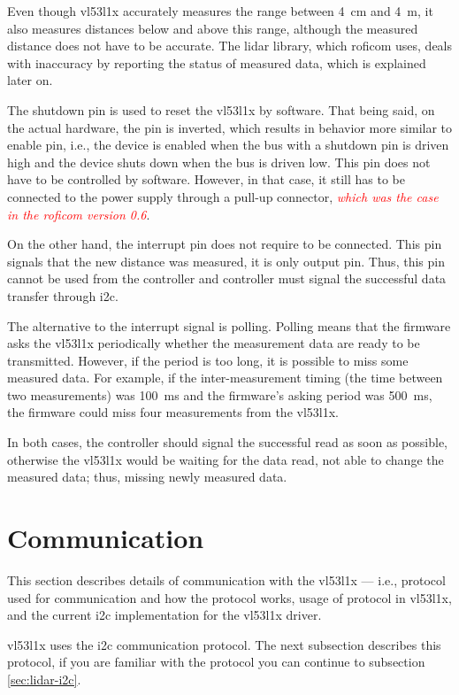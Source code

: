 \documentclass[
  digital,     %
  oneside,     %
  nosansbold,  %
  nocolorbold, %
  lof,         %
  lot,         %
]{fithesis4}
\newcommand{\TODO}[1]{\textcolor{red}{\textit{#1}}}
\begin{document}
{{{Even though \gls{vl53l1x} accurately measures the range between \qty{4}{\centi\metre} and \qty{4}{\metre}, it also measures distances below and above this range, although the measured distance does not have to be accurate. The lidar library, which \acrshort{roficom} uses, deals with inaccuracy by reporting the status of measured data, which is explained later on.

The shutdown pin is used to reset the \gls{vl53l1x} by software. That being said, on the actual hardware, the pin is inverted, which results in behavior more similar to enable pin, i.e., the device is enabled when the bus with a shutdown pin is driven high and the device shuts down when the bus is driven low. This pin does not have to be controlled by software. However, in that case, it still has to be connected to the power supply through a pull-up connector, \TODO{which was the case in the \acrshort{roficom} version 0.6}.

On the other hand, the interrupt pin does not require to be connected. This pin signals that the new distance was measured, it is only output pin. Thus, this pin cannot be used from the controller and controller must signal the successful data transfer through \acrshort{i2c}.

The alternative to the interrupt signal is polling. Polling means that the firmware asks the \gls{vl53l1x} periodically whether the measurement data are ready to be transmitted. However, if the period is too long, it is possible to miss some measured data. For example, if the inter-measurement timing (the time between two measurements) was \qty{100}{\milli\second} and the firmware's asking period was \qty{500}{\milli\second}, the firmware could miss four measurements from the \gls{vl53l1x}.

In both cases, the controller should signal the successful read as soon as possible, otherwise the \gls{vl53l1x} would be waiting for the data read, not able to change the measured data; thus, missing newly measured data.

\section{ Communication }
This section describes details of communication with the \gls{vl53l1x} --- i.e., protocol used for communication and how the protocol works, usage of protocol in \gls{vl53l1x}, and the current \acrshort{i2c} implementation for the \gls{vl53l1x} driver. 

\gls{vl53l1x} uses the \acrshort{i2c} communication protocol. The next subsection describes this protocol, if you are familiar with the protocol you can continue to subsection \ref{sec:lidar-i2c}.

}}}
\end{document}
